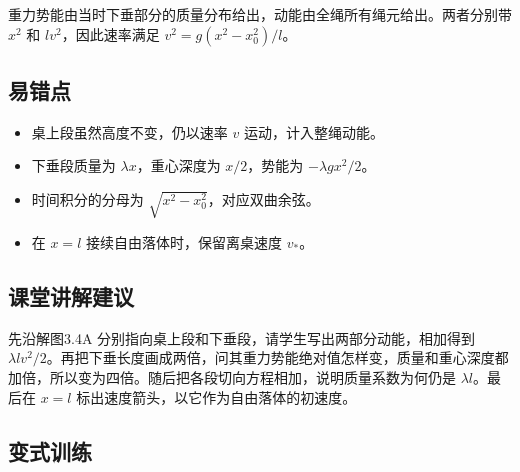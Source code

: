 \documentclass[UTF8,fontset=fandol,a4paper,11pt]{ctexart}
\begin{document}
重力势能由当时下垂部分的质量分布给出，动能由全绳所有绳元给出。两者分别带 $x^2$ 和 $lv^2$，因此速率满足 $v^2=g(x^2-x_0^2)/l$。



\subsection*{易错点}

\begin{itemize}
\item 桌上段虽然高度不变，仍以速率 $v$ 运动，计入整绳动能。
\item 下垂段质量为 $\lambda x$，重心深度为 $x/2$，势能为 $-\lambda gx^2/2$。
\item 时间积分的分母为 $\sqrt{x^2-x_0^2}$，对应双曲余弦。
\item 在 $x=l$ 接续自由落体时，保留离桌速度 $v_*$。
\end{itemize}



\subsection*{课堂讲解建议}

先沿解图3.4A 分别指向桌上段和下垂段，请学生写出两部分动能，相加得到 $\lambda lv^2/2$。再把下垂长度画成两倍，问其重力势能绝对值怎样变，质量和重心深度都加倍，所以变为四倍。随后把各段切向方程相加，说明质量系数为何仍是 $\lambda l$。最后在 $x=l$ 标出速度箭头，以它作为自由落体的初速度。



\subsection*{变式训练}
\end{document}
